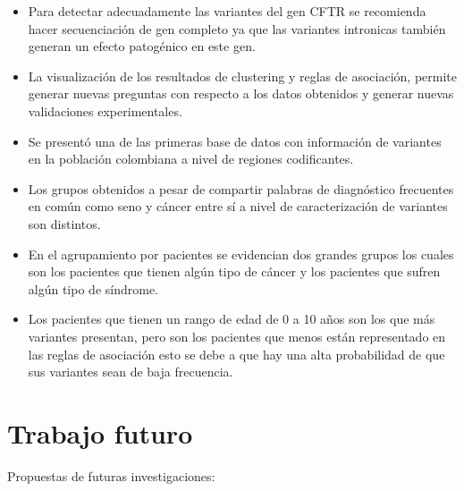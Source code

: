 \begin{itemize}
	\item Para detectar adecuadamente las variantes del gen CFTR se recomienda hacer secuenciación de gen completo ya que las variantes intronicas también generan un efecto patogénico en este gen.
	
	\item La visualización de los resultados de clustering y reglas de asociación, permite generar nuevas preguntas con respecto a los datos obtenidos y generar nuevas validaciones experimentales.
	
	\item Se presentó una de las primeras base de datos con información de variantes en la población colombiana a nivel de regiones codificantes.
	
	\item Los grupos obtenidos a pesar de compartir palabras de diagnóstico frecuentes en común como seno y cáncer entre sí a nivel de caracterización de variantes son distintos.
	
	\item En el agrupamiento por pacientes se evidencian dos grandes grupos los cuales son los pacientes que tienen algún tipo de cáncer y los pacientes que sufren algún tipo de síndrome. 
	
	\item Los pacientes que tienen un rango de edad de 0 a 10 años son los que más variantes presentan, pero son los pacientes que menos están representado en las reglas de asociación esto se debe a que hay una alta probabilidad de que sus variantes sean de baja frecuencia. 
	
	
	 
\end{itemize}

\section{Trabajo futuro}

Propuestas de futuras investigaciones:


